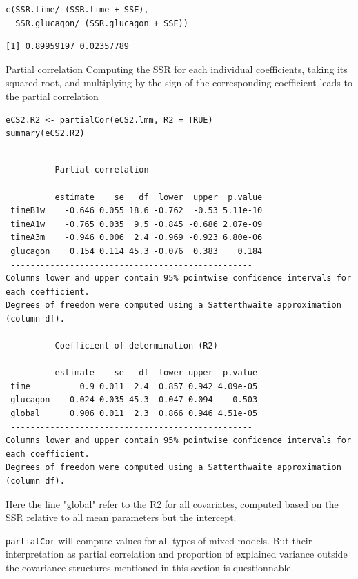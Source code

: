 \documentclass[12pt]{article}
\newcommand\Warning[1][3ex]{%
\renewcommand\stacktype{L}%
\scaleto{\stackon[1.3pt]{\color{red}$\triangle$}{\tiny\bfseries !}}{#1}%
\xspace
}
\begin{document}
\lstset{language=r,label= ,caption= ,captionpos=b,numbers=none}
\begin{lstlisting}
c(SSR.time/ (SSR.time + SSE),
  SSR.glucagon/ (SSR.glucagon + SSE))
\end{lstlisting}

\begin{verbatim}
[1] 0.89959197 0.02357789
\end{verbatim}


Partial correlation Computing the SSR for each individual
coefficients, taking its squared root, and multiplying by the sign of
the corresponding coefficient leads to the partial correlation
\lstset{language=r,label= ,caption= ,captionpos=b,numbers=none}
\begin{lstlisting}
eCS2.R2 <- partialCor(eCS2.lmm, R2 = TRUE)
summary(eCS2.R2)
\end{lstlisting}

\begin{verbatim}

	      Partial correlation 

          estimate    se   df  lower  upper  p.value
 timeB1w    -0.646 0.055 18.6 -0.762  -0.53 5.11e-10
 timeA1w    -0.765 0.035  9.5 -0.845 -0.686 2.07e-09
 timeA3m    -0.946 0.006  2.4 -0.969 -0.923 6.80e-06
 glucagon    0.154 0.114 45.3 -0.076  0.383    0.184
 ------------------------------------------------- 
Columns lower and upper contain 95% pointwise confidence intervals for each coefficient.
Degrees of freedom were computed using a Satterthwaite approximation (column df). 

	      Coefficient of determination (R2)

          estimate    se   df  lower upper  p.value
 time          0.9 0.011  2.4  0.857 0.942 4.09e-05
 glucagon    0.024 0.035 45.3 -0.047 0.094    0.503
 global      0.906 0.011  2.3  0.866 0.946 4.51e-05
 ------------------------------------------------- 
Columns lower and upper contain 95% pointwise confidence intervals for each coefficient.
Degrees of freedom were computed using a Satterthwaite approximation (column df).
\end{verbatim}

Here the line "global" refer to the R2 for all covariates, computed
based on the SSR relative to all mean parameters but the intercept.

\bigskip

\Warning \texttt{partialCor} will compute values for all types of mixed
models. But their interpretation as partial correlation and proportion
of explained variance outside the covariance structures mentioned in
this section is questionnable.
\end{document}
